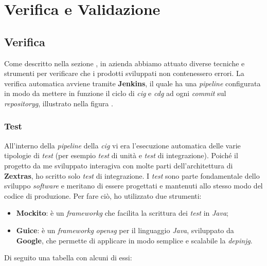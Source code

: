 \section{Verifica e Validazione}
\subsection{Verifica}
Come descritto nella sezione , in azienda abbiamo attuato diverse tecniche e strumenti per verificare che i prodotti sviluppati non contenessero errori. La verifica automatica avviene tramite \textbf{Jenkins}, il quale ha una \textit{pipeline} configurata in modo da mettere in funzione il ciclo di \textit{\gls{cig}} e \textit{\gls{cdg}} ad ogni \textit{commit} sul \textit{\gls{repositoryg}}, illustrato nella figura .
\subsubsection{Test}
All'interno della \textit{pipeline} della \textit{\gls{cig}} vi era l'esecuzione automatica delle varie tipologie di \textit{test} (per esempio \textit{test} di unità e \textit{test} di integrazione). Poiché il progetto da me sviluppato interagiva con molte parti dell'architettura di \textbf{Zextras}, ho scritto solo \textit{test} di integrazione. I \textit{test} sono parte fondamentale dello sviluppo \textit{software} e meritano di essere progettati e mantenuti allo stesso modo del codice di produzione. Per fare ciò, ho utilizzato due strumenti:
\begin{itemize}
    \item \textbf{Mockito}: è un \textit{\gls{frameworkg}} che facilita la scrittura dei \textit{test} in \textit{Java}; 
    \item \textbf{Guice}: è un \textit{\gls{frameworkg}} \textit{\gls{opensg}} per il linguaggio \textit{Java}, sviluppato da \textbf{Google}, che permette di applicare in modo semplice e scalabile la \textit{\gls{depinjg}}.
\end{itemize}
Di seguito una tabella con alcuni di essi:

